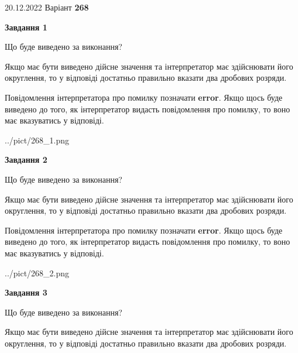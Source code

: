 \documentclass[12pt, ukrainian]{article}
\begin{document}
{20.12.2022 Варіант \No \textbf { 268 }\par}
{
\begin {Large}

{\begin {center}\textbf{Завдання 1}\end {center}}\par
Що буде виведено за виконання? \par

Якщо має бути виведено дійсне значення та інтерпретатор має здійснювати його округлення, 
то у відповіді достатньо правильно вказати два дробових розряди.

Повідомлення інтерпретатора про помилку позначати \textbf{error}.
Якщо щось буде виведено до того, як інтерпретатор видасть повідомлення про помилку, 
то воно має вказуватись у відповіді. \par

\begin{center}
	{../pict/268_1.png}
\end{center}
\newpage

{\begin {center}\textbf{Завдання 2}\end {center}}\par
Що буде виведено за виконання? \par

Якщо має бути виведено дійсне значення та інтерпретатор має здійснювати його округлення, 
то у відповіді достатньо правильно вказати два дробових розряди.

Повідомлення інтерпретатора про помилку позначати \textbf{error}.
Якщо щось буде виведено до того, як інтерпретатор видасть повідомлення про помилку, 
то воно має вказуватись у відповіді. \par

\begin{center}
	{../pict/268_2.png}
\end{center}
\newpage

{\begin {center}\textbf{Завдання 3}\end {center}}\par
Що буде виведено за виконання? \par

Якщо має бути виведено дійсне значення та інтерпретатор має здійснювати його округлення, 
то у відповіді достатньо правильно вказати два дробових розряди.


\end{Large}}
\end{document}
